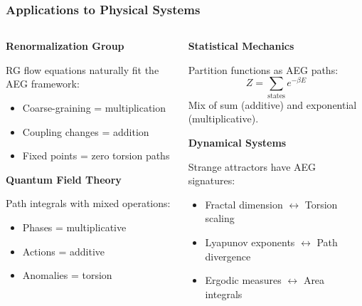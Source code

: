 \documentclass[aspectratio=169]{beamer}
\begin{document}
\begin{frame}
    \frametitle{Applications to Physical Systems}
    \begin{columns}
        \begin{column}{0.5\textwidth}
            \textbf{Renormalization Group}
            
            RG flow equations naturally fit the AEG framework:
            \begin{itemize}
                \item Coarse-graining = multiplication
                \item Coupling changes = addition
                \item Fixed points = zero torsion paths
            \end{itemize}
            
            \vspace{0.3cm}
            
            \textbf{Quantum Field Theory}
            
            Path integrals with mixed operations:
            \begin{itemize}
                \item Phases = multiplicative
                \item Actions = additive
                \item Anomalies = torsion
            \end{itemize}
        \end{column}
        \begin{column}{0.5\textwidth}
            \textbf{Statistical Mechanics}
            
            Partition functions as AEG paths:
            \[
                Z = \sum_{\text{states}} e^{-\beta E}
            \]
            Mix of sum (additive) and exponential (multiplicative).
            
            \vspace{0.3cm}
            
            \textbf{Dynamical Systems}
            
            Strange attractors have AEG signatures:
            \begin{itemize}
                \item Fractal dimension $\leftrightarrow$ Torsion scaling
                \item Lyapunov exponents $\leftrightarrow$ Path divergence
                \item Ergodic measures $\leftrightarrow$ Area integrals
            \end{itemize}
        \end{column}
    \end{columns}
\end{frame}
\end{document}
